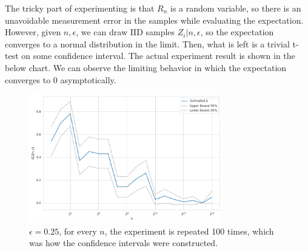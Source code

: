\documentclass[11pt, letterpaper]{article}
\begin{document}
The tricky part of experimenting is that $R_n$ is a random variable, so there is an unavoidable measurement error in the samples while evaluating the expectation. However, given $n, \epsilon$, we can draw IID samples $Z_i|n, \epsilon$, so the expectation converges to a normal distribution in the limit. Then, what is left is a trivial t-test on some confidence interval. The actual experiment result is shown in the below chart. We can observe the limiting behavior in which the expectation converges to 0 asymptotically.

\begin{figure}[!h]
  \centering
  \includegraphics[width=0.75\textwidth]{hw3-1.png}
  \captionsetup{justification=centering}
  \caption{$\epsilon = 0.25$, for every $n$, the experiment is repeated 100 times, which was how the confidence intervals were constructed.}
\end{figure}
\end{document}
